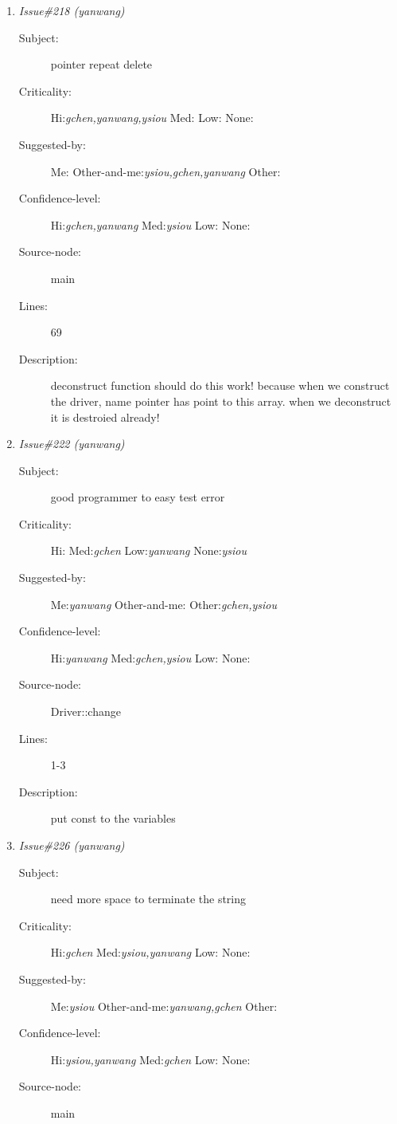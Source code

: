 \begin{enumerate}
\begin{description}
\item [Lines:] 10

\item [Description:] need to dereferent the name and then assign a value
\end{description}
\item {\it Issue\#218 (yanwang)}
\begin{description}
\item [Subject:] pointer repeat delete
\item [Criticality:] Hi:{\it gchen,yanwang,ysiou} Med:{\it } Low:{\it } None:{\it }
\item [Suggested-by:] Me:{\it } Other-and-me:{\it ysiou,gchen,yanwang} Other:{\it }
\item [Confidence-level:] Hi:{\it gchen,yanwang} Med:{\it ysiou} Low:{\it } None:{\it }
\item [Source-node:] main

\item [Lines:] 69

\item [Description:] deconstruct function should do this work!  because when we construct the
driver, name pointer has point to this array. when we deconstruct it is
destroied already!
\end{description}
\item {\it Issue\#222 (yanwang)}
\begin{description}
\item [Subject:] good programmer to easy test error
\item [Criticality:] Hi:{\it } Med:{\it gchen} Low:{\it yanwang} None:{\it ysiou}
\item [Suggested-by:] Me:{\it yanwang} Other-and-me:{\it } Other:{\it gchen,ysiou}
\item [Confidence-level:] Hi:{\it yanwang} Med:{\it gchen,ysiou} Low:{\it } None:{\it }
\item [Source-node:] Driver::change

\item [Lines:] 1-3

\item [Description:] put const to the variables
\end{description}
\item {\it Issue\#226 (yanwang)}
\begin{description}
\item [Subject:] need more space to terminate the string
\item [Criticality:] Hi:{\it gchen} Med:{\it ysiou,yanwang} Low:{\it } None:{\it }
\item [Suggested-by:] Me:{\it ysiou} Other-and-me:{\it yanwang,gchen} Other:{\it }
\item [Confidence-level:] Hi:{\it ysiou,yanwang} Med:{\it gchen} Low:{\it } None:{\it }
\item [Source-node:] main


\end{description}
\end{enumerate}
